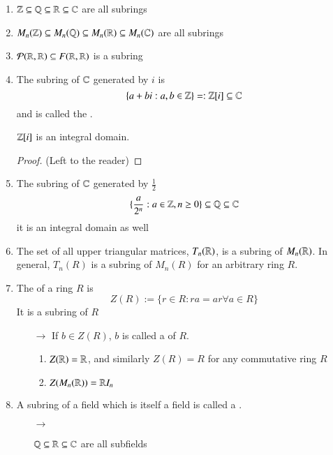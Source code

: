 \begin{example}
    \leavevmode
    \begin{enumerate}
        \item $\mathbb Z\subseteq \mathbb Q\subseteq \mathbb R\subseteq \mathbb C$ are all subrings
        \item $M_n(\mathbb Z) \subseteq M_n(\mathbb Q) \subseteq M_n(\mathbb R) \subseteq M_n(\mathbb C)$ are all subrings
        \item $\mathcal{P}(\mathbb R,\mathbb R) \subseteq F(\mathbb R,\mathbb R)$ is a subring
        \item The subring of $\mathbb C$ generated by $i$ is \begin{equation}
            \{a+bi:a,b \in \mathbb Z\}=:\mathbb Z[i] \subseteq \mathbb C
        \end{equation}
        and is called the .
        \begin{exercise}
            $\mathbb Z[i]$ is an integral domain.
            \begin{proof}
                    (Left to the reader)
            \end{proof}
        \end{exercise}
        \item The subring of $\mathbb C$ generated by $\frac{1}{2}$ $$\{\frac{a}{2^n}:a \in \mathbb Z, n \geq 0\} \subseteq \mathbb Q \subseteq \mathbb C$$
        it is an integral domain as well
        \item The set of all upper triangular matrices, $T_n(\mathbb R)$, is a subring of $M_n(\mathbb R)$. In general, $T_n(R)$ is a subring of $M_n(R)$ for an arbitrary ring $R$.
        \item The  of a ring $R$ is \begin{equation}
            Z(R):= \{r \in R:ra =ar\forall a \in R\}
        \end{equation}
        It is a subring of $R$
        \begin{enumerate}
            \item[$\rightarrow$] If $b \in Z(R)$, $b$ is called a  of $R$.
            \begin{example}
                \begin{enumerate}
                    \item $Z(\mathbb R) = \mathbb R$, and similarly $Z(R) = R$ for any commutative ring $R$
                    \item $Z(M_n(\mathbb R)) = \mathbb R I_n$
                \end{enumerate}
            \end{example}
        \end{enumerate}
        \item A subring of a field which is itself a field is called a .
        \begin{enumerate}
            \item[$\rightarrow$] \begin{example}
                $\mathbb Q\subseteq \mathbb R \subseteq \mathbb C$ are all subfields
            \end{example} 
        \end{enumerate}
    \end{enumerate}
\end{example}


